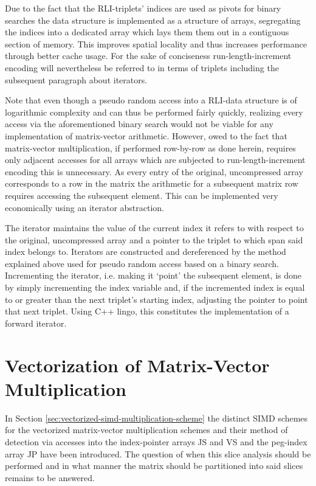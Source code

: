     Due to the fact that the RLI-triplets' indices are used as pivots for binary searches the data structure is
    implemented as a structure of arrays, segregating the indices into a dedicated array which lays them them out in a
    contiguous section of memory. This improves spatial locality and thus increases performance through better cache
    usage. For the sake of conciseness run-length-increment encoding will nevertheless be referred to in terms of
    triplets including the subsequent paragraph about iterators.

    Note that even though a pseudo random access into a RLI-data structure is of logarithmic complexity and can thus be
    performed fairly quickly, realizing every access via the aforementioned binary search would not be viable for any
    implementation of matrix-vector arithmetic. However, owed to the fact that matrix-vector multiplication, if
    performed row-by-row as done herein, requires only adjacent accesses for all arrays which are subjected to
    run-length-increment encoding this is unnecessary. As every entry of the original, uncompressed array corresponds
    to a row in the matrix the arithmetic for a subsequent matrix row requires accessing the subsequent element. This
    can be implemented very economically using an iterator abstraction.

    The iterator maintains the value of the current index it refers to with respect to the original, uncompressed array
    and a pointer to the triplet to which span said index belongs to. Iterators are constructed and dereferenced by the
    method explained above used for pseudo random access based on a binary search. Incrementing the iterator, i.e.
    making it `point' the subsequent element, is done by simply incrementing the index variable and, if the incremented
    index is equal to or greater than the next triplet's starting index, adjusting the pointer to point that next
    triplet. Using C++ lingo, this constitutes the implementation of a forward iterator.

  \section{Vectorization of Matrix-Vector Multiplication} \label{sec:vectorization-of-mvm}

    In Section \ref{sec:vectorized-simd-multiplication-scheme} the distinct SIMD schemes for the vectorized
    matrix-vector multiplication schemes and their method of detection via accesses into the index-pointer arrays JS
    and VS and the peg-index array JP have been introduced. The question of when this slice analysis should be
    performed and in what manner the matrix should be partitioned into said slices remains to be answered.

